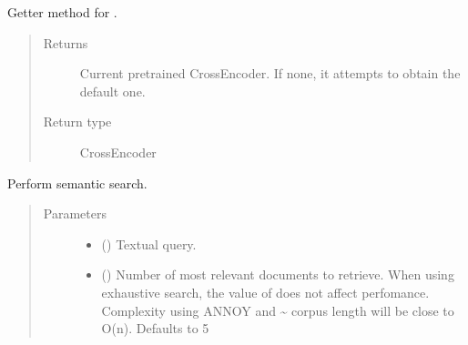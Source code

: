 \documentclass[letterpaper,10pt,english]{sphinxmanual}
\begin{document}
\begin{fulllineitems}
\begin{fulllineitems}
\end{fulllineitems}


\begin{fulllineitems}
\label{\detokenize{code:semantic_search.SemanticSearch.crossencoder}}
Getter method for .
\begin{quote}\begin{description}
\item[{Returns}] \leavevmode
Current pretrained Cross\sphinxhyphen{}Encoder. If none, it attempts to obtain
the default one.

\item[{Return type}] \leavevmode
CrossEncoder

\end{description}\end{quote}

\end{fulllineitems}


\begin{fulllineitems}
\label{\detokenize{code:semantic_search.SemanticSearch.search}}
Perform semantic search.
\begin{quote}\begin{description}
\item[{Parameters}] \leavevmode\begin{itemize}
\item {} 
 () \textendash{} Textual query.

\item {} 
 (\sphinxstyleliteralemphasis{\sphinxupquote{, }}) \textendash{} Number of most relevant documents to retrieve. When using exhaustive
search, the value of  does not affect perfomance. Complexity using ANNOY and
 \textasciitilde{} corpus length will be close to O(n). Defaults to 5


\end{itemize}
\end{description}
\end{quote}
\end{fulllineitems}
\end{fulllineitems}
\end{document}
